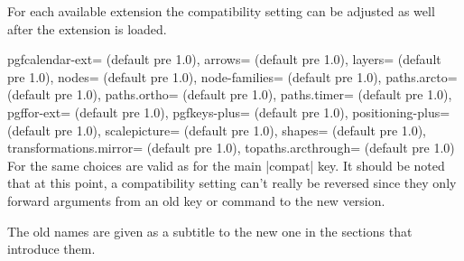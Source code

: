 \begin{multicols}{2}
\newcolumn\noindent
For each available extension the compatibility setting can be adjusted as well
after the extension is loaded.
\begin{keylist}{%
  pgfcalendar-ext= (default pre 1.0),
  arrows= (default pre 1.0),
  layers= (default pre 1.0),
  nodes= (default pre 1.0),
  node-families= (default pre 1.0),
  paths.arcto= (default pre 1.0),
  paths.ortho= (default pre 1.0),
  paths.timer= (default pre 1.0),
  pgffor-ext= (default pre 1.0),
  pgfkeys-plus= (default pre 1.0),
  positioning-plus= (default pre 1.0),
  scalepicture= (default pre 1.0),
  shapes= (default pre 1.0),
  transformations.mirror= (default pre 1.0),
  topaths.arcthrough= (default pre 1.0)%
}
  For  the same choices are valid as for the main |compat| key.
  It should be noted that at this point, a compatibility setting can't really be reversed
  since they only forward arguments from an old key or command to the new version.
  
  The old names are given as a subtitle to the new one in the sections that introduce them.
\end{keylist}
\end{multicols}
